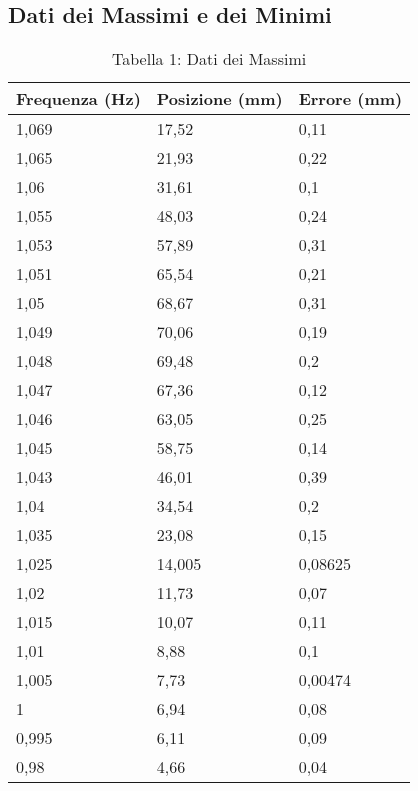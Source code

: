 \documentclass[12pt]{article}
\begin{document}
\subsection{Dati dei Massimi e dei Minimi}


\begin{table}[ht]
  \begin{minipage}{0.40\textwidth}
    \centering
    \captionsetup{labelformat=empty} %
    \caption{Tabella 1: Dati dei Massimi}
    \begin{tabularx}{\linewidth}{|X|X|X|}
      \hline
      Frequenza (Hz) & Posizione (mm) & Errore (mm) \\
      \hline
      1,069 & 17,52 & 0,11 \\
      1,065 & 21,93 & 0,22 \\
      1,06 & 31,61 & 0,1 \\
      1,055 & 48,03 & 0,24 \\
      1,053 & 57,89 & 0,31 \\
      1,051 & 65,54 & 0,21 \\
      1,05 & 68,67 & 0,31 \\
      1,049 & 70,06 & 0,19 \\
      1,048 & 69,48 & 0,2 \\
      1,047 & 67,36 & 0,12 \\
      1,046 & 63,05 & 0,25 \\
      1,045 & 58,75 & 0,14 \\
      1,043 & 46,01 & 0,39 \\
      1,04 & 34,54 & 0,2 \\
      1,035 & 23,08 & 0,15 \\
      1,025 & 14,005 & 0,08625 \\
      1,02 & 11,73 & 0,07 \\
      1,015 & 10,07 & 0,11 \\
      1,01 & 8,88 & 0,1 \\
      1,005 & 7,73 & 0,00474 \\
      1 & 6,94 & 0,08 \\
      0,995 & 6,11 & 0,09 \\
      0,98 & 4,66 & 0,04 \\
      \hline
    \end{tabularx}
  \end{minipage}
  \hfill
  \begin{minipage}{0.40\textwidth}

\end{minipage}
\end{table}
\end{document}
